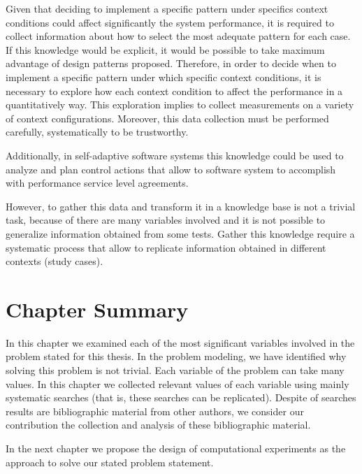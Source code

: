 Given that deciding to implement a specific pattern under specifics context conditions could affect significantly the system performance, it is required to collect information about how to select the most adequate pattern for each case. If this knowledge would be explicit, it would be possible to take maximum advantage of design patterns proposed. Therefore, in order to decide when to implement a specific pattern under which specific context conditions, it is necessary to explore how each context condition to affect the performance in a quantitatively way. This exploration implies to collect measurements on a variety of context configurations. Moreover, this data collection must be performed carefully, systematically to be trustworthy. 

Additionally, in self-adaptive software systems this knowledge could be used to analyze and plan control actions that allow to software system to accomplish with performance service level agreements.

However, to gather this data and transform it in a knowledge base is not a trivial task, because of there are many variables involved and it is not possible to generalize information obtained from some tests. Gather this knowledge require a systematic process that allow to replicate information obtained in different contexts (study cases).


\section{Chapter Summary}

In this chapter we examined each of the most significant variables involved in the problem stated for this thesis. In the problem modeling, we have identified why solving this problem is not trivial. Each variable of the problem can take many values. In this chapter we collected relevant values of each variable using mainly systematic searches (that is, these searches can be replicated). Despite of searches results are bibliographic material from other authors, we consider our contribution the collection and analysis of these bibliographic material.

In the next chapter we propose the design of computational experiments as the approach to solve our stated problem statement.